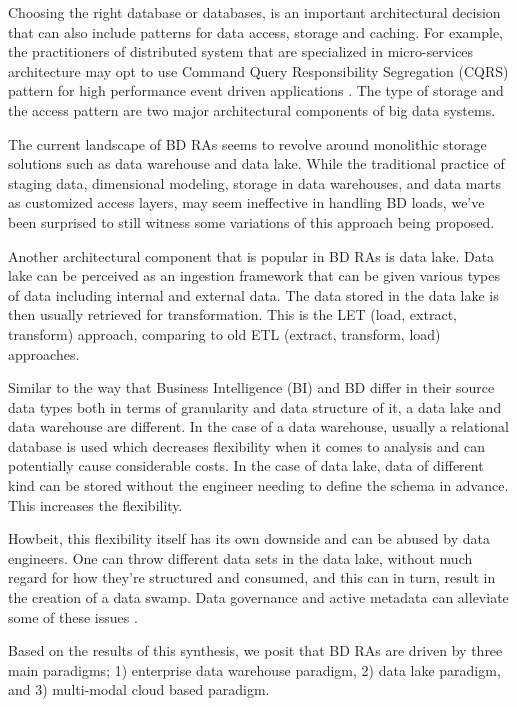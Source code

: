 \documentclass{ieeeaccess}
\begin{document}
Choosing the right database or databases, is an important architectural decision that can also include patterns for data access, storage and caching. For example, the practitioners of distributed system that are specialized in micro-services architecture may opt to use Command Query Responsibility Segregation (CQRS) pattern for high performance event driven applications \cite{marquez2018actual}. The type of storage and the access pattern are two major architectural components of big data systems. 

The current landscape of BD RAs seems to revolve around monolithic storage solutions such as data warehouse and data lake. While the traditional practice of staging data, dimensional modeling, storage in data warehouses, and data marts as customized access layers, may seem ineffective in handling BD loads, we've been surprised to still witness some variations of this approach being proposed.  

Another architectural component that is popular in BD RAs is data lake. Data lake can be perceived as an ingestion framework that can be given various types of data including internal and external data. The data stored in the data lake is then usually retrieved for transformation. This is the LET (load, extract, transform) approach, comparing to old ETL (extract, transform, load) approaches. 

Similar to the way that Business Intelligence (BI) and BD differ in their source data types both in terms of granularity and data structure of it, a data lake and data warehouse are different. In the case of a data warehouse, usually a relational database is used which decreases flexibility when it comes to analysis and can potentially cause considerable costs. In the case of data lake, data of different kind can be stored without the engineer needing to define the schema in advance. This increases the flexibility.

Howbeit, this flexibility itself has its own downside and can be abused by data engineers. One can throw different data sets in the data lake, without much regard for how they’re structured and consumed, and this can in turn, result in the creation of a data swamp. Data governance and active metadata can alleviate some of these issues \cite{monolithToMesh}.

Based on the results of this synthesis, we posit that BD RAs are driven by three main paradigms; 1) enterprise data warehouse paradigm, 2) data lake paradigm, and 3) multi-modal cloud based paradigm. 
\end{document}
